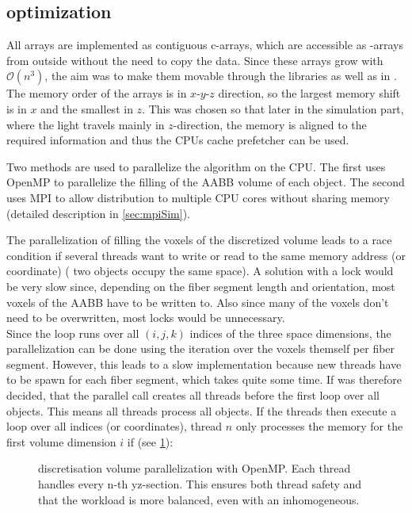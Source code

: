 \subsection{optimization}\label{sec:dvOpti}
%
All arrays are implemented as contiguous c-arrays, which are accessible as -arrays from outside without the need to copy the data.
Since these arrays grow with $\mathcal{O}(n^3)$, the aim was to make them movable through the \cpp{} libraries as well as in \python{}.
The memory order of the arrays is in $x\text{-}y\text{-}z$ direction, so the largest memory shift is in $x$ and the smallest in $z$.
This was chosen so that later in the simulation part, where the light travels mainly in $z$-direction, the memory is aligned to the required information and thus the \acp{CPU} cache prefetcher can be used.
\par
%
Two methods are used to parallelize the algorithm on the \ac{CPU}.
The first uses \ac{OpenMP} to parallelize the filling of the \ac{AABB} volume of each object.
The second uses \ac{MPI} to allow distribution to multiple \ac{CPU} cores without sharing memory (detailed description in \cref{sec:mpiSim}).
\par
%
The parallelization of filling the voxels of the discretized volume leads to a race condition if several threads want to write or read to the same memory address (or coordinate) (\eg{} two objects occupy the same space).
A solution with a lock would be very slow since, depending on the fiber segment length and orientation, most voxels of the \ac{AABB} have to be written to.
Also since many of the voxels don't need to be overwritten, most locks would be unnecessary.
\\
Since the loop runs over all $(i,j,k)$ indices of the three space dimensions, the parallelization can be done using the iteration over the voxels themself per fiber segment.
However, this leads to a slow implementation because new threads have to be spawn for each fiber segment, which takes quite some time.
If was therefore decided, that the parallel call creates all threads before the first loop over all objects.
This means all threads process all objects.
If the threads then execute a loop over all indices (or coordinates), thread $n$ only processes the memory for the first volume dimension $i$ if (see \cref{fig:discVolThread}):
%
\begin{figure}[!t]
\centering
\setlength{\tikzwidth}{0.5\textwidth}
\caption[discretized volume parallelization]{discretisation volume parallelization with \ac{OpenMP}. Each thread handles every n-th yz-section. This ensures both thread safety and that the workload is more balanced, even with an inhomogeneous.}
\label{fig:discVolThread}
\end{figure}
